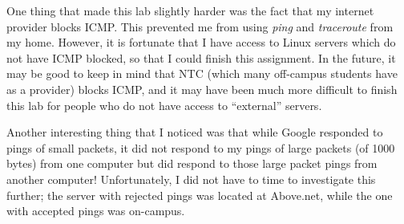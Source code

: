 \documentclass[11pt]{article}
\begin{document}
One thing that made this lab slightly harder was the fact that my internet provider blocks ICMP. This prevented me from using \emph{ping} and \emph{traceroute} from my home. However, it is fortunate that I have access to Linux servers which do not have ICMP blocked, so that I could finish this assignment. In the future, it may be good to keep in mind that NTC (which many off-campus students have as a provider) blocks ICMP, and it may have been much more difficult to finish this lab for people who do not have access to ``external'' servers.

Another interesting thing that I noticed was that while Google responded to pings of small packets, it did not respond to my pings of large packets (of 1000 bytes) from one computer but did respond to those large packet pings from another computer! Unfortunately, I did not have to time to investigate this further; the server with rejected pings was located at Above.net, while the one with accepted pings was on-campus.
\end{document}
